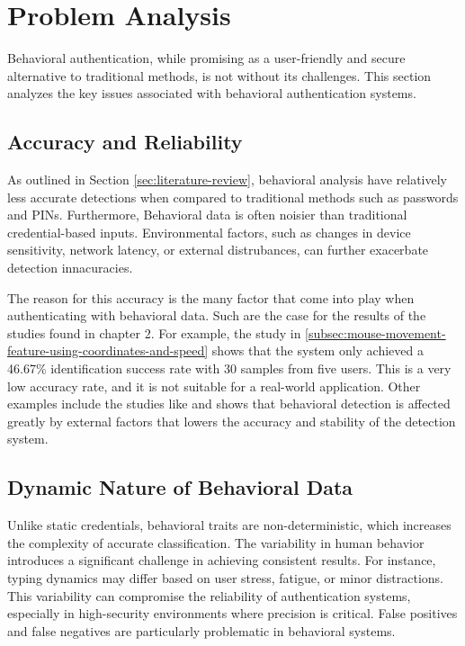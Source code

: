 \section{Problem Analysis}
\label{sec:problem-analysis}

Behavioral authentication, while promising as a user-friendly and secure alternative to traditional methods, is not without its challenges. This section analyzes the key issues associated with behavioral authentication systems.

\subsection{Accuracy and Reliability}
As outlined in Section \ref{sec:literature-review}, behavioral analysis have relatively less accurate detections when compared to traditional methods such as passwords and PINs. Furthermore, Behavioral data is often noisier than traditional credential-based inputs. Environmental factors, such as changes in device sensitivity, network latency, or external distrubances, can further exacerbate detection innacuracies.

The reason for this accuracy is the many factor that come into play when authenticating with behavioral data. Such are the case for the results of the studies found in chapter 2. For example, the study in \ref{subsec:mouse-movement-feature-using-coordinates-and-speed} shows that the system only achieved a 46.67\% identification success rate with 30 samples from five users. This is a very low accuracy rate, and it is not suitable for a real-world application. Other examples include the studies like \parencite{22_Keystroke} and \parencite{17_Phone} shows that behavioral detection is affected greatly by external factors that lowers the accuracy and stability of the detection system.

\subsection{Dynamic Nature of Behavioral Data}
Unlike static credentials, behavioral traits are non-deterministic, which increases the complexity of accurate classification. The variability in human behavior introduces a significant challenge in achieving consistent results. For instance, typing dynamics may differ based on user stress, fatigue, or minor distractions. This variability can compromise the reliability of authentication systems, especially in high-security environments where precision is critical. False positives and false negatives are particularly problematic in behavioral systems.

